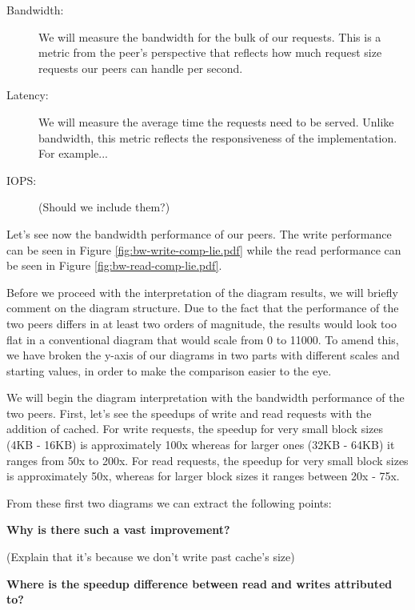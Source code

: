 \begin{description}
	\item[Bandwidth:] We will measure the bandwidth for the bulk of our 
		requests. This is a metric from the peer's perspective that reflects 
		how much request size requests our peers can handle per second.
	\item[Latency:] We will measure the average time the requests need to be 
		served. Unlike bandwidth, this metric reflects the responsiveness of 
		the implementation. For example...
	\item[IOPS:] (Should we include them?)
\end{description}

Let's see now the bandwidth performance of our peers. The write performance can 
be seen in Figure \ref{fig:bw-write-comp-lie.pdf} while the read performance 
can be seen in Figure \ref{fig:bw-read-comp-lie.pdf}.


Before we proceed with the interpretation of the diagram results, we will 
briefly comment on the diagram structure. Due to the fact that the performance 
of the two peers differs in at least two orders of magnitude, the results would 
look too flat in a conventional diagram that would scale from 0 to 11000. To 
amend this, we have broken the y-axis of our diagrams in two parts with 
different scales and starting values, in order to make the comparison easier to 
the eye.

We will begin the diagram interpretation with the bandwidth performance of the 
two peers. First, let's see the speedups of write and read requests with the 
addition of cached. For write requests, the speedup for very small block sizes 
(4KB - 16KB) is approximately 100x whereas for larger ones (32KB - 64KB) it 
ranges from 50x to 200x. For read requests, the speedup for very small block 
sizes is approximately 50x, whereas for larger block sizes it ranges between 
20x - 75x.

From these first two diagrams we can extract the following points:

\textbf{Why is there such a vast improvement?}

(Explain that it's because we don't write past cache's size)

\textbf{Where is the speedup difference between read and writes attributed to?}

